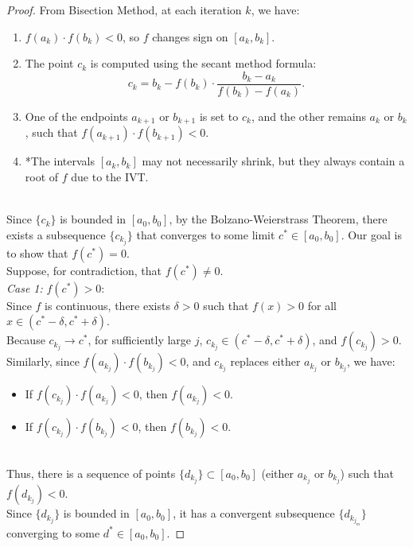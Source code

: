\documentclass{article}
\begin{document}
\begin{proof}
From Bisection Method, at each iteration \( k \), we have: 
\\
\begin{enumerate}
    \item \( f(a_k) \cdot f(b_k) < 0 \), so \( f \) changes sign on \( [a_k, b_k] \).
    \item The point \( c_k \) is computed using the secant method formula:
    \[
        c_k = b_k - f(b_k) \cdot \frac{b_k - a_k}{f(b_k) - f(a_k)}.
    \]
    \item One of the endpoints \( a_{k+1} \) or \( b_{k+1} \) is set to \( c_k \), and the other remains \( a_k \) or \( b_k \), such that \( f(a_{k+1}) \cdot f(b_{k+1}) < 0 \).
    \item *The intervals \( [a_k, b_k] \) may not necessarily shrink, but they always contain a root of \( f \) due to the IVT.
\end{enumerate}
\\
Since \( \{ c_k \} \) is bounded in \( [a_0, b_0] \), by the Bolzano-Weierstrass Theorem, there exists a subsequence \( \{ c_{k_j} \} \) that converges to some limit \( c^\ast \in [a_0, b_0] \).
Our goal is to show that \( f(c^\ast) = 0 \).
\\
Suppose, for contradiction, that \( f(c^\ast) \neq 0 \).
\\
\textit{Case 1:} \( f(c^\ast) > 0 \):
\\
Since \( f \) is continuous, there exists \( \delta > 0 \) such that \( f(x) > 0 \) for all \( x \in (c^\ast - \delta, c^\ast + \delta) \).
\\
Because \( c_{k_j} \to c^\ast \), for sufficiently large \( j \), \( c_{k_j} \in (c^\ast - \delta, c^\ast + \delta) \), and \( f(c_{k_j}) > 0 \).
\\
Similarly, since \( f(a_{k_j}) \cdot f(b_{k_j}) < 0 \), and \( c_{k_j} \) replaces either \( a_{k_j} \) or \( b_{k_j} \), we have:
\begin{itemize}
    \item If \( f(c_{k_j}) \cdot f(a_{k_j}) < 0 \), then \( f(a_{k_j}) < 0 \).
    \item If \( f(c_{k_j}) \cdot f(b_{k_j}) < 0 \), then \( f(b_{k_j}) < 0 \).
\end{itemize}
\\
Thus, there is a sequence of points \( \{ d_{k_j} \} \subset [a_0, b_0] \) (either \( a_{k_j} \) or \( b_{k_j} \)) such that \( f(d_{k_j}) < 0 \).
\\
Since \( \{ d_{k_j} \} \) is bounded in \( [a_0, b_0] \), it has a convergent subsequence \( \{ d_{k_{j_m}} \} \) converging to some \( d^\ast \in [a_0, b_0] \).

\end{proof}
\end{document}
